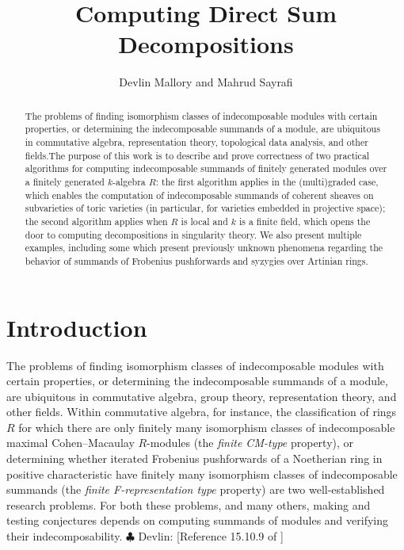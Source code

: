 \documentclass[12pt]{article}
\title{Computing Direct Sum Decompositions}
\author{Devlin Mallory and Mahrud Sayrafi}
\theoremstyle{theorem}
\numberwithin{thm}{section}
\theoremstyle{definition}
\newcommand{\devlin}[1]{{\color{red} \sf $\clubsuit$ Devlin: [#1]}}
\begin{document}
\maketitle

\begin{abstract}
  The problems of finding isomorphism classes of indecomposable modules with certain properties, or determining the indecomposable summands of a module, are ubiquitous in commutative algebra, representation theory, topological data analysis, and other fields.\linebreak The purpose of this work is to describe and prove correctness of two practical algorithms for computing indecomposable summands of finitely generated modules over a finitely generated $k$-algebra $R$: the first algorithm applies in the (multi)graded case, which enables the computation of indecomposable summands of coherent sheaves on subvarieties of toric varieties (in particular, for varieties embedded in projective space); the second algorithm applies when $R$ is local and $k$ is a finite field, which opens the door to computing decompositions in singularity theory. We also present multiple examples, including some which present previously unknown phenomena regarding the behavior of summands of Frobenius pushforwards and syzygies over Artinian rings.
\end{abstract}



\section{Introduction}

The problems of finding isomorphism classes of indecomposable modules with certain properties, or determining the indecomposable summands of a module, are ubiquitous in commutative algebra, group theory, representation theory, and other fields. Within commutative algebra, for instance, the classification of rings $R$ for which there are only finitely many isomorphism classes of indecomposable maximal Cohen--Macaulay $R$-modules (the \emph{finite CM-type} property), or determining whether iterated Frobenius pushforwards of a Noetherian ring in positive characteristic have finitely many isomorphism classes of indecomposable summands (the \emph{finite F-representation type} property) are two well-established research problems. For both these problems, and many others, making and testing conjectures depends on computing summands of modules and verifying their indecomposability.
\devlin{Reference 15.10.9 of \cite{Eisenbud95}}
\end{document}

